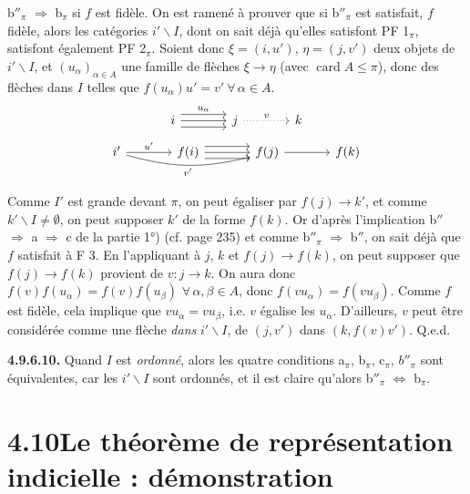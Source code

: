 \documentclass[11pt]{article}
\newcommand{\printedpage}[1]{\marginpar{\footnotesize p.~#1}}
\newcommand{\msp}[1]{\marginpar{\footnotesize [#1]}}
\newcommand{\card}{\operatorname{card}}
\begin{document}
b$''_\pi$ $\Longrightarrow$ b$_\pi$ si $f$ est fidèle. On est ramené à prouver que si b$''_\pi$ est satisfait, $f$ fidèle, alors les catégories $i'\backslash I$, dont on sait déjà qu'elles satisfont PF 1$_\pi$, satisfont également PF 2$_\pi$. Soient donc $\xi = (i, u')$, $\eta = (j, v')$ deux objets de $i'\backslash I$, et $(u_\alpha)_{\alpha\in A}$ une famille de flèches $\xi \longrightarrow \eta$ (avec $\card A \leqslant \pi$), donc des flèches dans $I$ telles que $f(u_\alpha)u' = v' \ \forall\, \alpha \in A$.
\[
\begin{tikzcd}[column sep=large]
i \arrow[r, shift left=2, "u_\alpha"] \arrow[r] \arrow[r, shift right=2] & j \arrow[r, dotted, "v"] & k
\end{tikzcd}
\]
\[
\begin{tikzcd}[column sep=large]
i' \arrow[r, "u'"] \arrow[rr, bend right=15, "v'"'] & f(i) \arrow[r, shift left=2] \arrow[r] \arrow[r, shift right=2] & f(j) \arrow[r] & f(k)
\end{tikzcd}
\]

Comme $I'$ est grande devant $\pi$, on peut égaliser par $f(j) \longrightarrow k'$, et comme $k'\backslash I \neq \emptyset$, on peut supposer $k'$ de la forme $f(k)$. Or
\msp{page 242}
d'après l'implication b$''$ $\Longrightarrow$ a $\Longrightarrow$ c de la partie 1°) (cf. page 235) et comme b$''_\pi$ $\Longrightarrow$ b$''$, on sait déjà que $f$ satisfait à F 3. En l'appliquant à $j$, $k$ et $f(j) \longrightarrow f(k)$, on peut
\printedpage{91}
supposer que $f(j) \longrightarrow f(k)$ provient de $v : j \longrightarrow k$. On aura donc $f(v)f(u_\alpha) = f(v)f(u_\beta)$ $\forall\, \alpha, \beta \in A$, donc $f(vu_\alpha) = f(vu_\beta)$. Comme $f$ est fidèle, cela implique que $vu_\alpha = vu_\beta$, i.e. $v$ égalise les $u_\alpha$. D'ailleurs, $v$ peut être considérée comme une flèche \textit{dans} $i'\backslash I$, de $(j, v')$ dans $(k, f(v)v')$. Q.e.d.

\textbf{4.9.6.10.} Quand $I$ est \textit{ordonné}, alors les quatre conditions a$_\pi$, b$_\pi$, c$_\pi$, $b''_\pi$ sont équivalentes, car les $i'\backslash I$ sont ordonnés, et il est claire qu'alors b$''_\pi$ $\Longleftrightarrow$ b$_\pi$. %

\msp{page 243}

\section*{4.10\quad Le théorème de représentation indicielle : démonstration}
\end{document}
